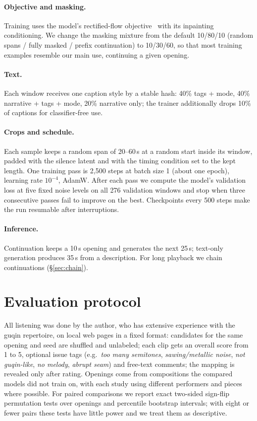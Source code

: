 \documentclass[11pt]{article}
\begin{document}
\paragraph{Objective and masking.} Training uses the model's rectified-flow objective~\citep{liu2022rectified}
with its inpainting conditioning. We change the masking mixture from the default
10/80/10 (random spans / fully masked / prefix continuation) to 10/30/60, so that most training examples
resemble our main use, continuing a given opening.

\paragraph{Text.} Each window receives one caption style by a stable hash: 40\% tags + mode, 40\% narrative +
tags + mode, 20\% narrative only; the trainer additionally drops 10\% of captions for classifier-free use.

\paragraph{Crops and schedule.} Each sample keeps a random span of 20--60\,s at a random start inside its window,
padded with the silence latent and with the timing condition set to the kept length. One training pass is
2{,}500 steps at batch size 1 (about one epoch), learning rate $10^{-4}$, AdamW. After each pass we compute the
model's validation loss at five fixed noise levels on all 276 validation windows and stop when three
consecutive passes fail to improve on the best. Checkpoints every 500 steps make the run resumable after
interruptions.

\paragraph{Inference.} Continuation keeps a 10\,s opening and generates the next 25\,s; text-only generation
produces 35\,s from a description. For long playback we chain continuations (\S\ref{sec:chain}).

\section{Evaluation protocol}\label{sec:eval}

All listening was done by the author, who has extensive experience with the guqin repertoire, on local
web pages in a fixed format: candidates for the same opening and seed are shuffled and unlabeled; each clip
gets an overall score from 1 to 5, optional issue tags (e.g.\ \emph{too many semitones}, \emph{sawing/metallic
noise}, \emph{not guqin-like}, \emph{no melody}, \emph{abrupt seam}) and free-text comments; the mapping is
revealed only after rating. Openings come from compositions the compared models did not train on, with each
study using different performers and pieces where possible. For paired comparisons we report exact two-sided
sign-flip permutation tests over openings and percentile bootstrap intervals; with eight or fewer pairs these
tests have little power and we treat them as descriptive.
\end{document}
